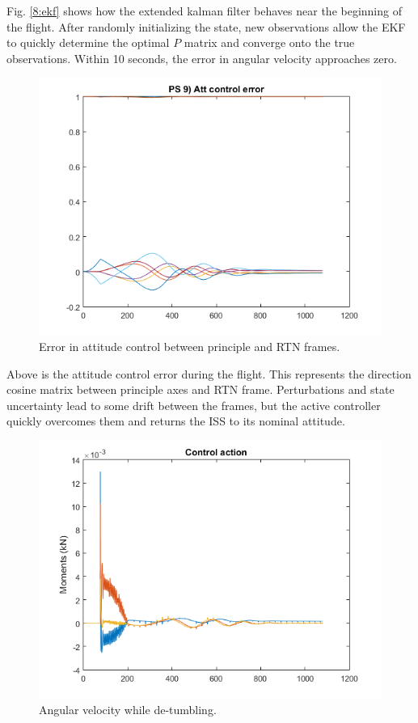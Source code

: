 \documentclass[12pt, letterpaper]{article}
\begin{document}
Fig. \ref{8:ekf} shows how the extended kalman filter behaves near the beginning of the flight. After randomly initializing the state, new observations allow the EKF to quickly determine the optimal $P$ matrix and converge onto the true observations. Within 10 seconds, the error in angular velocity approaches zero.

\begin{figure}[H]
	\centering
	\includegraphics[scale=0.8]{ps8_03}
	\caption{Error in attitude control between principle and RTN frames.}
	\label{8:attError}
\end{figure}

Above is the attitude control error during the flight. This represents the direction cosine matrix between principle axes and RTN frame. Perturbations and state uncertainty lead to some drift between the frames, but the active controller quickly overcomes them and returns the ISS to its nominal attitude.

\begin{figure}[H]
	\centering
	\includegraphics[scale=0.8]{ps8_04}
	\caption{Angular velocity while de-tumbling.}
	\label{8:angvel}
\end{figure}
\end{document}
